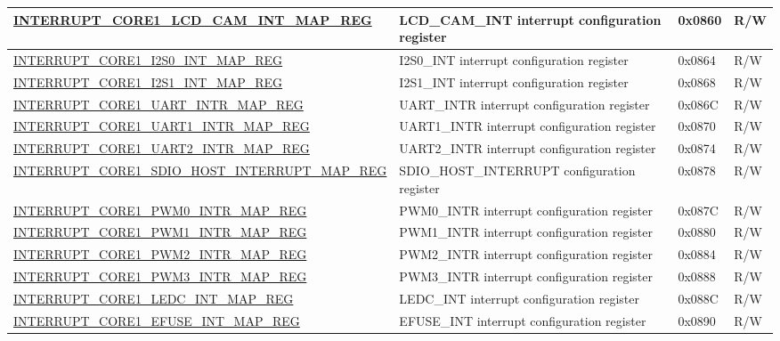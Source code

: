 \begin{landscape}
\begin{longtable}{ | p{10cm} | p{10.2cm} | p{1.3cm} | p{1cm} | }
\hyperref[regdesc:INTERRUPTCORE1LCDCAMINTMAPREG]{INTERRUPT\_CORE1\_LCD\_CAM\_INT\_MAP\_REG} & LCD\_CAM\_INT interrupt configuration register & 0x0860 & R/W \\ \hline
\hyperref[regdesc:INTERRUPTCORE1I2S0INTMAPREG]{INTERRUPT\_CORE1\_I2S0\_INT\_MAP\_REG} & I2S0\_INT interrupt configuration register & 0x0864 & R/W \\ \hline
\hyperref[regdesc:INTERRUPTCORE1I2S1INTMAPREG]{INTERRUPT\_CORE1\_I2S1\_INT\_MAP\_REG} & I2S1\_INT interrupt configuration register & 0x0868 & R/W \\ \hline
\hyperref[regdesc:INTERRUPTCORE1UARTINTRMAPREG]{INTERRUPT\_CORE1\_UART\_INTR\_MAP\_REG} & UART\_INTR interrupt configuration register & 0x086C & R/W \\ \hline
\hyperref[regdesc:INTERRUPTCORE1UART1INTRMAPREG]{INTERRUPT\_CORE1\_UART1\_INTR\_MAP\_REG} & UART1\_INTR interrupt configuration register & 0x0870 & R/W \\ \hline
\hyperref[regdesc:INTERRUPTCORE1UART2INTRMAPREG]{INTERRUPT\_CORE1\_UART2\_INTR\_MAP\_REG} & UART2\_INTR interrupt configuration register & 0x0874 & R/W \\ \hline
\hyperref[regdesc:INTERRUPTCORE1SDIOHOSTINTERRUPTMAPREG]{INTERRUPT\_CORE1\_SDIO\_HOST\_INTERRUPT\_MAP\_REG} & SDIO\_HOST\_INTERRUPT configuration register & 0x0878 & R/W \\ \hline
\hyperref[regdesc:INTERRUPTCORE1PWM0INTRMAPREG]{INTERRUPT\_CORE1\_PWM0\_INTR\_MAP\_REG} & PWM0\_INTR interrupt configuration register & 0x087C & R/W \\ \hline
\hyperref[regdesc:INTERRUPTCORE1PWM1INTRMAPREG]{INTERRUPT\_CORE1\_PWM1\_INTR\_MAP\_REG} & PWM1\_INTR interrupt configuration register & 0x0880 & R/W \\ \hline
\hyperref[regdesc:INTERRUPTCORE1PWM2INTRMAPREG]{INTERRUPT\_CORE1\_PWM2\_INTR\_MAP\_REG} & PWM2\_INTR interrupt configuration register & 0x0884 & R/W \\ \hline
\hyperref[regdesc:INTERRUPTCORE1PWM3INTRMAPREG]{INTERRUPT\_CORE1\_PWM3\_INTR\_MAP\_REG} & PWM3\_INTR interrupt configuration register & 0x0888 & R/W \\ \hline
\hyperref[regdesc:INTERRUPTCORE1LEDCINTMAPREG]{INTERRUPT\_CORE1\_LEDC\_INT\_MAP\_REG} & LEDC\_INT interrupt configuration register & 0x088C & R/W \\ \hline
\hyperref[regdesc:INTERRUPTCORE1EFUSEINTMAPREG]{INTERRUPT\_CORE1\_EFUSE\_INT\_MAP\_REG} & EFUSE\_INT interrupt configuration register & 0x0890 & R/W \\ \hline

\end{longtable}
\end{landscape}
